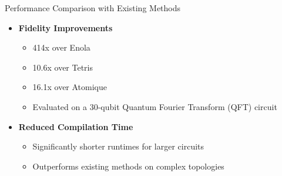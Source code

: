 \documentclass{beamer}
\begin{document}
\begin{frame}{Performance Comparison with Existing Methods}
  \begin{itemize}
    \item \textbf{Fidelity Improvements}
      \begin{itemize}
        \item 414x over Enola
        \item 10.6x over Tetris
        \item 16.1x over Atomique
        \item Evaluated on a 30-qubit Quantum Fourier Transform (QFT) circuit
      \end{itemize}
    \item \textbf{Reduced Compilation Time}
      \begin{itemize}
        \item Significantly shorter runtimes for larger circuits
        \item Outperforms existing methods on complex topologies
      \end{itemize}
  \end{itemize}

\end{frame}
\end{document}
